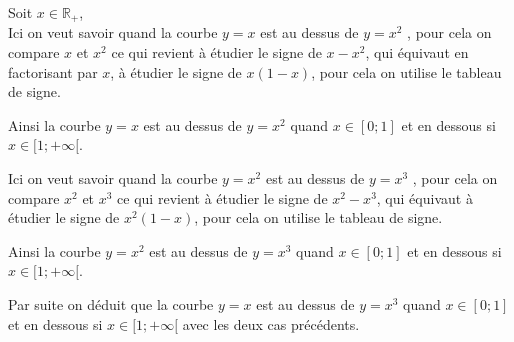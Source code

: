 \documentclass[french]{book}
\begin{document}
Soit $x \in \mathbb{R}_+$,\\

Ici on veut savoir quand la courbe $y=x$ est au dessus de $y=x^2$ , pour cela on compare $x$ et $x^2$ ce qui revient à étudier le signe de $x-x^2$, qui équivaut en factorisant par $x$, à étudier le signe de $x(1-x)$, pour cela on utilise le tableau de signe.


\begin{center}
\end{center}

Ainsi la courbe $y=x$ est au dessus de $y=x^2$ quand $x \in [0;1]$ et en dessous si $x \in [1; + \infty[$.


Ici on veut savoir quand la courbe $y=x^2$ est au dessus de $y=x^3$ , pour cela on compare $x^2$ et $x^3$ ce qui revient à étudier le signe de $x^2-x^3$, qui équivaut à étudier le signe de $x^2(1-x)$, pour cela on utilise le tableau de signe.


\begin{center}
\end{center}

Ainsi la courbe $y=x^2$ est au dessus de $y=x^3$ quand $x \in [0;1]$ et en dessous si $x \in [1; + \infty[$.

Par suite on déduit que la courbe $y=x$ est au dessus de $y=x^3$ quand $x \in [0;1]$ et en dessous si $x \in [1; + \infty[$ avec les deux cas précédents.
\end{document}
